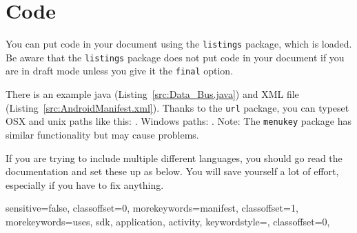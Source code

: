 \chapter{Code}\label{cha:code}
You can put code in your document using the \texttt{listings} package, which is
loaded.  Be aware that the \texttt{listings}
package does not put code in your document if you are in draft mode
unless you give it the \texttt{final} option.

There is an example java (Listing~\ref{src:Data_Bus.java}) and XML
file (Listing~\ref{src:AndroidManifest.xml}). Thanks to the
\texttt{url} package, you can typeset OSX and unix paths like this:
. Windows paths:
. Note: The \texttt{menukey} package has
similar functionality but may cause problems.

If you are trying to include multiple different languages, you should
go read the documentation and set these up as below.  You
will save yourself a lot of effort, especially if you have to fix
anything.

\lstset{%
  language=,%
  style=default,
}


%
{  %
  sensitive=false,%
  classoffset=0,  %
  morekeywords={manifest},
  classoffset=1,  %
  morekeywords={uses, sdk, application, activity},
  keywordstyle=\color{blue}, %
  classoffset=0, %
}


